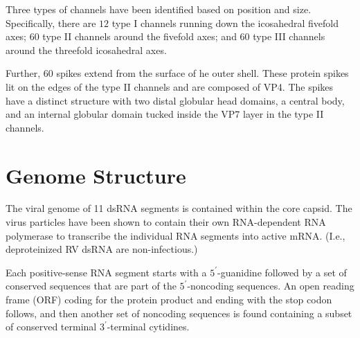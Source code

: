 \documentclass[11pt,final] {article}
\begin{document}
Three types of channels have been identified based on position and size. Specifically, there are $12$ type I channels running down the icosahedral fivefold axes; 60 type II channels around the fivefold axes; and 60 type III channels around the threefold icosahedral axes.

Further, 60 spikes extend from the surface of he outer shell. These protein spikes lit on the edges of the type II channels and are composed of VP4. The spikes have a distinct structure with two distal globular head domains, a central body, and an internal globular domain tucked inside the VP7 layer in the type II channels.  

\section{Genome Structure}

The viral genome of 11 dsRNA segments is contained within the core capsid. The virus particles have been shown to contain their own RNA-dependent RNA polymerase to transcribe the individual RNA segments into active mRNA. (I.e., deproteinized RV dsRNA are non-infectious.)

Each positive-sense RNA segment starts with a $5^{\prime}$-guanidine followed by a set of conserved sequences that are part of the $5^{\prime}$-noncoding sequences. An open reading frame (ORF) coding for the protein product and ending with the stop codon follows, and then another set of noncoding sequences is found containing a subset of conserved terminal $3^{\prime}$-terminal cytidines.
\end{document}

